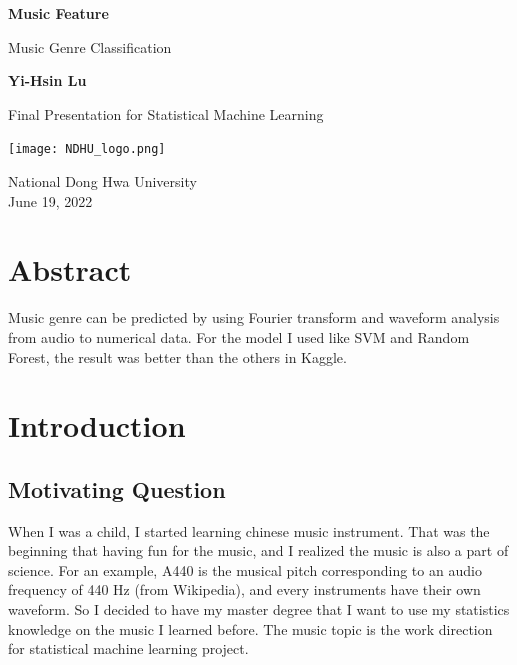 \documentclass[12pt,a4paper]{article}
\begin{document}
\begin{titlepage}
   \begin{center}
       \vspace*{1cm}

       \textbf{\Huge{Music Feature}}

       \vspace{0.5cm}
        \Large{Music Genre Classification}
            
       \vspace{1.5cm}

       \textbf{Yi-Hsin Lu}

       \vfill
            
        Final Presentation for Statistical Machine Learning
            
       \vspace{0.8cm}
     
       \texttt{[image: NDHU\_logo.png]}
            
       National Dong Hwa University\\
       June 19, 2022
   \end{center}
\end{titlepage}

\tableofcontents

\newpage

\section*{Abstract}
Music genre can be predicted by using Fourier transform and waveform analysis from audio to numerical data. For the model I used like SVM and Random Forest, the result was better than the others in Kaggle.


\section{Introduction}
\subsection{Motivating Question}
When I was a child, I started learning chinese music instrument. That was the beginning that having fun for the music, and I realized the music is also a part of science. For an example, A440 is the musical pitch corresponding to an audio frequency of 440 Hz (from Wikipedia), and every instruments have their own waveform. So I decided to have my master degree that I want to use my statistics knowledge on the music I learned before. The music topic is the work direction for statistical machine learning project.
\end{document}

